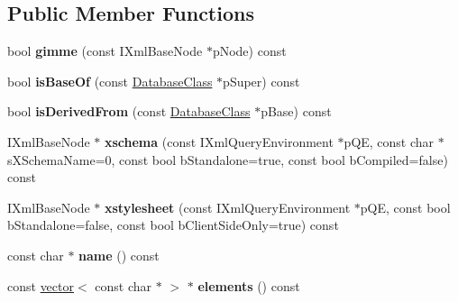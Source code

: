 \subsection*{\-Public \-Member \-Functions}
\begin{DoxyCompactItemize}
\item 
\hypertarget{classgeneral__server_1_1DatabaseClass_a5772997ee7a230dbdbad5bd68d97ffc3}{bool {\bfseries gimme} (const \-I\-Xml\-Base\-Node $\ast$p\-Node) const }\label{classgeneral__server_1_1DatabaseClass_a5772997ee7a230dbdbad5bd68d97ffc3}

\item 
\hypertarget{classgeneral__server_1_1DatabaseClass_ad7c0c6208e191ca0228dd81ec154a8b1}{bool {\bfseries is\-Base\-Of} (const \hyperlink{classgeneral__server_1_1DatabaseClass}{\-Database\-Class} $\ast$p\-Super) const }\label{classgeneral__server_1_1DatabaseClass_ad7c0c6208e191ca0228dd81ec154a8b1}

\item 
\hypertarget{classgeneral__server_1_1DatabaseClass_ae5808b1e62b58fedd950b5ca9465c5ac}{bool {\bfseries is\-Derived\-From} (const \hyperlink{classgeneral__server_1_1DatabaseClass}{\-Database\-Class} $\ast$p\-Base) const }\label{classgeneral__server_1_1DatabaseClass_ae5808b1e62b58fedd950b5ca9465c5ac}

\item 
\hypertarget{classgeneral__server_1_1DatabaseClass_aab8fc1d764580988b934966b171489b6}{\-I\-Xml\-Base\-Node $\ast$ {\bfseries xschema} (const \-I\-Xml\-Query\-Environment $\ast$p\-Q\-E, const char $\ast$s\-X\-Schema\-Name=0, const bool b\-Standalone=true, const bool b\-Compiled=false) const }\label{classgeneral__server_1_1DatabaseClass_aab8fc1d764580988b934966b171489b6}

\item 
\hypertarget{classgeneral__server_1_1DatabaseClass_ad171e1938d05939836b15295b042a96b}{\-I\-Xml\-Base\-Node $\ast$ {\bfseries xstylesheet} (const \-I\-Xml\-Query\-Environment $\ast$p\-Q\-E, const bool b\-Standalone=false, const bool b\-Client\-Side\-Only=true) const }\label{classgeneral__server_1_1DatabaseClass_ad171e1938d05939836b15295b042a96b}

\item 
\hypertarget{classgeneral__server_1_1DatabaseClass_a3731050ae4c136a8ba3450d558c22343}{const char $\ast$ {\bfseries name} () const }\label{classgeneral__server_1_1DatabaseClass_a3731050ae4c136a8ba3450d558c22343}

\item 
\hypertarget{classgeneral__server_1_1DatabaseClass_a29ec75615f6dd624a8b795878e62809c}{const \hyperlink{classvector}{vector}$<$ const char $\ast$ $>$ $\ast$ {\bfseries elements} () const }\label{classgeneral__server_1_1DatabaseClass_a29ec75615f6dd624a8b795878e62809c}


\end{DoxyCompactItemize}

